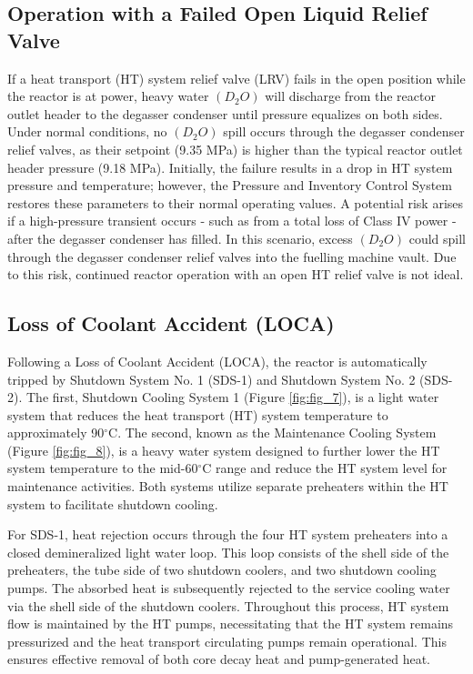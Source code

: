 \documentclass[12pt]{article}
\begin{document}
\begin{multicols}{2}

\subsection{Operation with a Failed Open Liquid Relief Valve}

If a heat transport (HT) system relief valve (LRV) fails in the open position while the reactor is at power, heavy water $(D_2O)$ will discharge from the reactor outlet header to the degasser condenser until pressure equalizes on both sides. Under normal conditions, no $(D_2O)$ spill occurs through the degasser condenser relief valves, as their setpoint (9.35 MPa) is higher than the typical reactor outlet header pressure (9.18 MPa). Initially, the failure results in a drop in HT system pressure and temperature; however, the Pressure and Inventory Control System restores these parameters to their normal operating values. A potential risk arises if a high-pressure transient occurs - such as from a total loss of Class IV power - after the degasser condenser has filled. In this scenario, excess $(D_2O)$ could spill through the degasser condenser relief valves into the fuelling machine vault. Due to this risk, continued reactor operation with an open HT relief valve is not ideal.

\subsection{Loss of Coolant Accident (LOCA)}

Following a Loss of Coolant Accident (LOCA), the reactor is automatically tripped by Shutdown System No. 1 (SDS-1) and Shutdown System No. 2 (SDS-2). The first, Shutdown Cooling System 1 (Figure \ref{fig:fig_7}), is a light water system that reduces the heat transport (HT) system temperature to approximately 90$^{\circ}$C. The second, known as the Maintenance Cooling System (Figure \ref{fig:fig_8}), is a heavy water system designed to further lower the HT system temperature to the mid-60$^{\circ}$C range and reduce the HT system level for maintenance activities. Both systems utilize separate preheaters within the HT system to facilitate shutdown cooling.

For SDS-1, heat rejection occurs through the four HT system preheaters into a closed demineralized light water loop. This loop consists of the shell side of the preheaters, the tube side of two shutdown coolers, and two shutdown cooling pumps. The absorbed heat is subsequently rejected to the service cooling water via the shell side of the shutdown coolers. Throughout this process, HT system flow is maintained by the HT pumps, necessitating that the HT system remains pressurized and the heat transport circulating pumps remain operational. This ensures effective removal of both core decay heat and pump-generated heat. 


\end{multicols}
\end{document}

